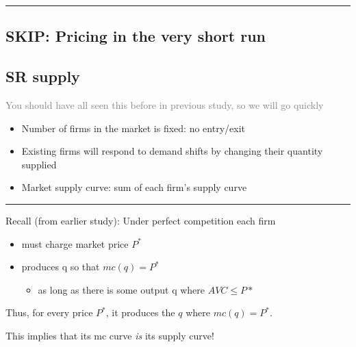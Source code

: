\documentclass[]{article}
\providecommand{\tightlist}{%
  \setlength{\itemsep}{0pt}\setlength{\parskip}{0pt}}
\begin{document}
\begin{center}\rule{0.5\linewidth}{\linethickness}\end{center}

\hypertarget{skip-pricing-in-the-very-short-run}{%
\subsection{SKIP: Pricing in the very short
run}\label{skip-pricing-in-the-very-short-run}}

\hypertarget{sr-supply}{%
\subsection{SR supply}\label{sr-supply}}

\textcolor{gray}{You should have all seen this before in previous study, so we will go quickly}

\begin{itemize}
\item
  Number of firms in the market is fixed: no entry/exit
\item
  Existing firms will respond to demand shifts by changing their
  quantity supplied
\item
  Market supply curve: sum of each firm's supply curve
\end{itemize}

\begin{center}\rule{0.5\linewidth}{\linethickness}\end{center}

Recall (from earlier study): Under perfect competition each firm

\begin{itemize}
\tightlist
\item
  must charge market price \(P^*\)
\item
  produces q so that \(mc(q)=P^*\)

  \begin{itemize}
  \tightlist
  \item
    as long as there is some output q where \(AVC \leq P*\)
  \end{itemize}
\end{itemize}

\bigskip

Thus, for every price \(P^{*}\), it produces the \(q\) where
\(mc(q)=P^{*}\).

\bigskip

This implies that its mc curve \emph{is} its supply curve!\\
\end{document}
